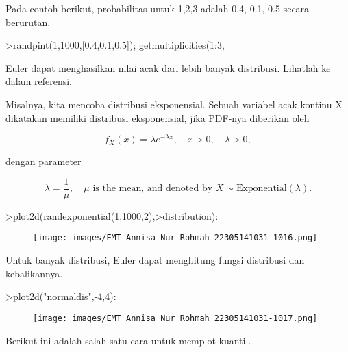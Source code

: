 \documentclass[a4paper,10pt]{article}
\begin{document}
\begin{eulernotebook}
\begin{eulercomment}
\begin{eulercomment}
\begin{eulercomment}
\begin{eulercomment}
\begin{eulercomment}
Pada contoh berikut, probabilitas untuk 1,2,3 adalah 0.4, 0.1, 0.5
secara berurutan.
\end{eulercomment}
\begin{eulerprompt}
>randpint(1,1000,[0.4,0.1,0.5]); getmultiplicities(1:3,%
\end{eulerprompt}
\begin{euleroutput}
  [378,  102,  520]
\end{euleroutput}
\begin{eulercomment}
Euler dapat menghasilkan nilai acak dari lebih banyak distribusi.
Lihatlah ke dalam referensi.

Misalnya, kita mencoba distribusi eksponensial. Sebuah variabel acak
kontinu X dikatakan memiliki distribusi eksponensial, jika PDF-nya
diberikan oleh\\
\end{eulercomment}
\begin{eulerformula}
\[
f_X(x)=\lambda e^{-\lambda x},\quad x>0,\quad \lambda>0,
\]
\end{eulerformula}
\begin{eulercomment}
dengan parameter\\
\end{eulercomment}
\begin{eulerformula}
\[
\lambda=\frac{1}{\mu},\quad \mu \text{ is the mean, and denoted by } X \sim \text{Exponential}(\lambda).
\]
\end{eulerformula}
\begin{eulerprompt}
>plot2d(randexponential(1,1000,2),>distribution):
\end{eulerprompt}
\begin{figure}[h]
    \centering
    \texttt{[image: images/EMT\_Annisa Nur Rohmah\_22305141031-1016.png]}
\end{figure}
\begin{eulercomment}
Untuk banyak distribusi, Euler dapat menghitung fungsi distribusi dan
kebalikannya.
\end{eulercomment}
\begin{eulerprompt}
>plot2d("normaldis",-4,4): 
\end{eulerprompt}
\begin{figure}[h]
    \centering
    \texttt{[image: images/EMT\_Annisa Nur Rohmah\_22305141031-1017.png]}
\end{figure}
\begin{eulercomment}
Berikut ini adalah salah satu cara untuk memplot kuantil.
\end{eulercomment}
\begin{eulerprompt}

\end{eulerprompt}
\end{eulercomment}
\end{eulercomment}
\end{eulercomment}
\end{eulercomment}
\end{eulernotebook}
\end{document}
